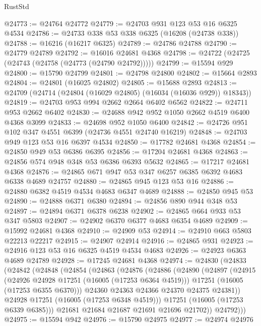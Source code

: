 \begin{lexlean}{RustStd}
\begin{coremodule}
@24773 := @24764 @24772
@24779 := @24703 @931 @123 @53 @16 @6325 @4534
@24786 := @24733 @338 @53 @338 @6325 (@16208 (@24738 @338))
@24788 := @16216 (@16217 @6325)
@24789 := @24786 @24788
@24790 := @24779 @24789
@24792 := @16016 @24681 @4368
@24798 := @24722 (@24725 (@24743 (@24758 (@24773 (@24790 @24792)))))
@24799 := @15594 @929
@24800 := @15790 @24799
@24801 := @24798 @24800
@24802 := @15664 @2893
@24804 := @24801 (@16025 @24802)
@24805 := @15688 @2893
@24813 := @24709 (@24714 (@24804 (@16029 @24805) (@16034 (@16036 @929)) @18343))
@24819 := @24703 @953 @994 @2662 @2664 @6402 @6562
@24822 := @24711 @953 @2662 @6402
@24830 := @24688 @942 @952 @1050 @2662 @4519 @6400 @4368 @3099
@24833 := @24698 @952 @1050 @6400
@24842 := @24726 @951 @102 @347 @4551 @6399 (@24736 @4551 @24740 @16219)
@24848 := @24703 @949 @123 @53 @16 @6397 @4534
@24850 := @17782 @24681 @4368
@24854 := @24850 @949 @53 @6386 @6395
@24856 := @17204 @24681 @4368
@24863 := @24856 @574 @948 @348 @53 @6386 @6393 @5632
@24865 := @17217 @24681 @4368
@24876 := @24865 @671 @947 @53 @347 @6257 @6385 @6392 @4683 @6338 @4689 @24757
@24880 := @24865 @945 @123 @53 @16
@24886 := @24880 @6382 @4519 @4534 @4683 @6347 @4689
@24888 := @24850 @945 @53
@24890 := @24888 @6371 @6380
@24894 := @24856 @890 @944 @348 @53
@24897 := @24894 @6371 @6378 @6238
@24902 := @24865 @664 @933 @53 @347 @5803
@24907 := @24902 @6370 @6377 @4683 @6354 @4689
@24909 := @15992 @24681 @4368
@24910 := @24909 @53
@24914 := @24910 @663 @5803 @22213 @22217
@24915 := @24907 @24914
@24916 := @24865 @931
@24923 := @24916 @123 @53 @16 @6325 @4519 @4534 @4683
@24926 := @24923 @6363 @4689 @24789
@24928 := @17245 @24681 @4368
@24974 := @24830
    (@24833
      (@24842
        (@24848
          (@24854
            (@24863
              (@24876
                (@24886
                  (@24890
                    (@24897
                      (@24915
                        (@24926 @24928 @17251 (@16005 (@17253 @6364 @4519)))
                        @17251
                        (@16005 (@17253 @6355 @6370)))
                      @24360
                      @24363
                      @24366
                      @24370
                      @24375
                      @24381))
                  @24928
                  @17251
                  (@16005 (@17253 @6348 @4519)))
                @17251
                (@16005 (@17253 @6339 @6385)))
              @21681
              @21684
              @21687
              @21691
              @21696
              @21702))
          @24792)))
@24975 := @15594 @942
@24976 := @15790 @24975
@24977 := @24974 @24976

\end{coremodule}
\end{lexlean}
